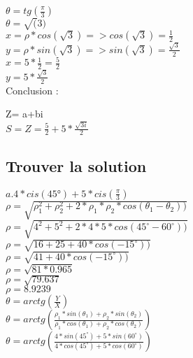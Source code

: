 \vspace{3mm} %
$\theta = tg(\frac{\pi}{3})$\\
$\theta = \sqrt(3)$\\

$x= \rho * cos(\sqrt{3}) => cos(\sqrt{3}) = \frac{1}{2}$ \\
$y= \rho * sin(\sqrt{3}) => sin(\sqrt{3}) = \frac{\sqrt{3}}{2}$ \\


$x= 5*\frac{1}{2} = \frac{5}{2}$ \\
$y= 5*\frac{\sqrt{3}}{2}$ \\

\vspace{2mm} %
Conclusion :\\
\vspace{2mm} %

Z= a+bi \\
$ S= Z=\frac{5}{2} + 5*\frac{\sqrt{3i}} {2}$

\vspace{3mm} %
\subsection{Trouver la solution}
\vspace{3mm} %

$a. 4*cis(45°) + 5*cis(\frac{\pi}{3})$\\

$\rho = \sqrt{\rho_1^{2}+\rho_2^{2} + 2 * \rho_1 * \rho_2 * cos(\theta_1-\theta_2))}$ \\
$\rho = \sqrt{4^{2}+5^{2} + 2*4*5 * cos(45^{\circ}-60^{\circ}))}$ \\
$\rho = \sqrt{16+25 + 40 * cos(-15^{\circ}))}$ \\
$\rho = \sqrt{41 + 40 * cos(-15^{\circ}))}$ \\
$\rho = \sqrt{81 * 0.965}$ \\
$\rho = \sqrt{79.637}$ \\
$\rho = 8.9239 $ \\

$\theta = arctg(\frac{Y}{X})$\\
$\theta = arctg(\frac{\rho_1 * sin(\theta_1) + \rho_2 * sin(\theta_2)} {\rho_1 * cos(\theta_1) + \rho_2 * cos(\theta_2)})$ \\

$\theta = arctg(\frac{4 * sin(45^{\circ}) + 5 * sin(60^{\circ})} {4 * cos(45^{\circ}) + 5 * cos(60^{\circ})})$ \\

